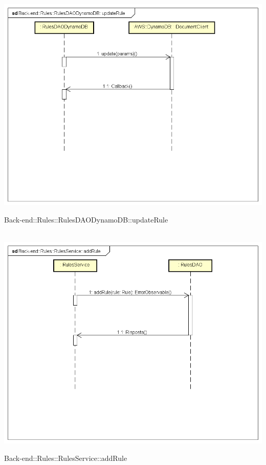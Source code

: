 \\ \includegraphics[width=\textwidth,height=\textheight,keepaspectratio]{images/diagrams/back-end/Ufficial_Backend/Back-end__Rules__RulesDAODynamoDB__updateRule.png} 	\caption{Back-end::Rules::RulesDAODynamoDB::updateRule}
\\ \includegraphics[width=\textwidth,height=\textheight,keepaspectratio]{images/diagrams/back-end/Ufficial_Backend/Back-end__Rules__RulesService__addRule.png} 	\caption{Back-end::Rules::RulesService::addRule}
